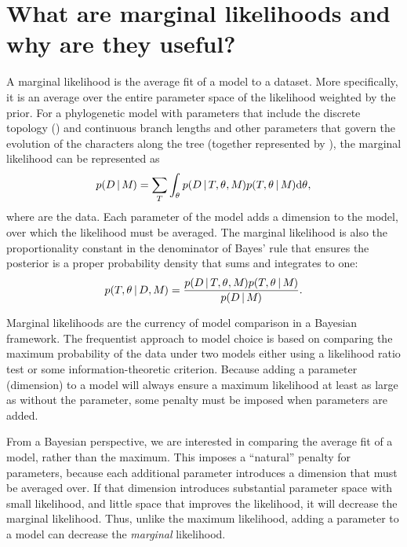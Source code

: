 \section{What are marginal likelihoods and why are they useful?}

\begin{linenomath}
A marginal likelihood is the average fit of a model to a dataset.
More specifically, it is an average over the entire parameter space of the
likelihood weighted by the prior.
For a phylogenetic model \model with parameters that include the discrete
topology (\topology) and continuous branch lengths and other parameters that
govern the evolution of the characters along the tree (together represented by
\evoparameters), the marginal likelihood can be represented as
\begin{equation}
    p(D \,|\, M_{}) =
    \sum\limits_{T}
    \int_{\theta_{}}
    p( D \,|\, T, \theta_{}, M_{})
    p(T, \theta_{} \,|\, M_{})
    \mathrm{d}\theta_{},
    \label{eq:marginalLikelihood}
\end{equation}
where \data are the data.
Each parameter of the model adds a dimension to the model, over which the
likelihood must be averaged.
The marginal likelihood is also the proportionality constant in the denominator
of Bayes' rule that ensures the posterior is a proper probability density that
sums and integrates to one:
\begin{equation}
    p(T, \theta_{} \,|\, D, M_{}) = \frac{
        p(D \,|\, T, \theta_{}, M_{})
        p(T, \theta_{} \,|\, M_{})
    }{
        p(D \,|\, M_{})
    }.
    \label{eq:bayesRule}
\end{equation}
\end{linenomath}


Marginal likelihoods are the currency of model comparison in a Bayesian
framework. The frequentist approach to model choice is based on comparing
the maximum probability of the data under two models either using
a likelihood ratio test or some information-theoretic criterion.
Because adding a parameter (dimension) to a model will always ensure
a maximum likelihood at least as large as without the parameter, some
penalty must be imposed when parameters are added.

From a Bayesian perspective, we are interested in comparing the average fit of
a model, rather than the maximum.
This imposes a ``natural'' penalty for parameters, because each additional
parameter introduces a dimension that must be averaged over.
If that dimension introduces substantial parameter space with small likelihood,
and little space that improves the likelihood, it will decrease the marginal
likelihood.
Thus, unlike the maximum likelihood, adding a parameter to a model can
decrease the \emph{marginal} likelihood.


